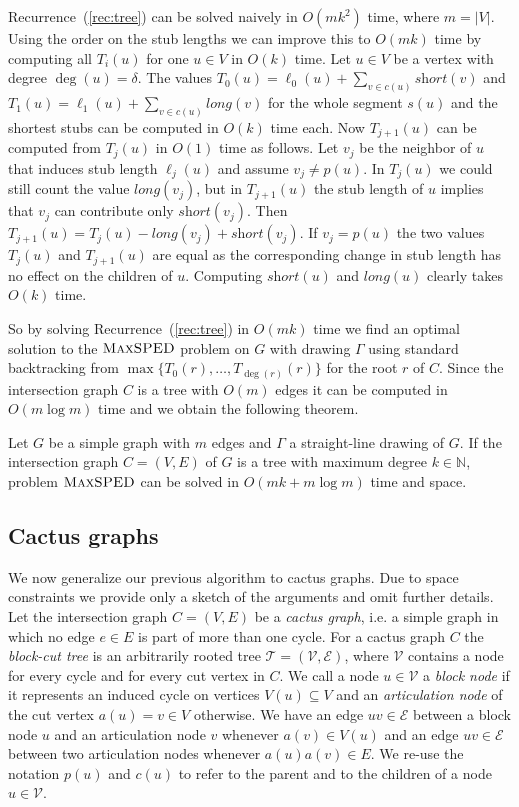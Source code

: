 \documentclass[a4paper, USenglish]{llncs}
\newcommand{\maxsped}{\ensuremath{\textsc{MaxSPED}}\xspace}
\newcommand{\sollong}{\ensuremath{\textit{long}}\xspace}
\newcommand{\solshort}{\ensuremath{\textit{short}}\xspace}
\begin{document}
	Recurrence~(\ref{rec:tree}) can be solved naively in $ O(mk^2) $ time, where $m = |V|$. 
	Using the order on the stub lengths  we can improve this to $ O(mk) $ time by computing all $ T_i(u) $ for one $ u \in V $ in $O(k)$ time.
	Let $u \in V$ be a vertex with degree $\deg(u) = \delta$. 
	The values $T_0(u) = \ell_0(u) + \sum_{v\in c(u)} \solshort(v)$ and $T_1(u) = \ell_1(u) + \sum_{v\in c(u)} \sollong(v)$ for the whole segment $s(u)$ and the shortest stubs can be computed in $O(k)$ time each.
	Now $T_{j+1}(u)$ can be computed from $T_j(u)$ in $O(1)$ time as follows.
	Let $v_j $ be the neighbor of $u$ that induces stub length $\ell_j(u)$ and assume $v_j \ne p(u)$.
	In $T_j(u)$ we could still count the value $\sollong(v_j)$, but in $T_{j+1}(u)$ the stub length of $u$ implies that $v_j$ can contribute only $\solshort(v_j)$. 
	Then $T_{j+1}(u) = T_j(u) - \sollong(v_j) + \solshort(v_j)$.
	If $v_j=p(u)$ the two values $T_j(u)$ and $T_{j+1}(u)$ are equal as the corresponding change in stub length has no effect on the children of $u$.
	Computing $\solshort(u)$ and $\sollong(u)$ clearly takes $O(k)$ time.
	
	So by solving Recurrence~(\ref{rec:tree}) in $O(mk)$ time we find an optimal solution to the \maxsped problem on $ G $ with drawing $ \Gamma $ using standard backtracking from $\max\{T_0(r), \dots, T_{\deg(r)}(r)\}$ for the root $r$ of $C$.	
	Since the intersection graph $C$ is a tree with $O(m)$ edges it can be computed in $O(m \log m)$ time and we obtain the following theorem.
	
	\begin{theorem}
		\label{thm:tree}
		Let $ G $ be a simple graph with $m$ edges and $ \Gamma $ a straight-line drawing of $ G $. If the intersection graph $ C = (V,E) $ of $ G $ is a tree with maximum degree $ k \in \mathbb{N} $, problem \maxsped can be solved in $ O(mk + m \log m) $ time and space.
	\end{theorem}

	\subsection{Cactus graphs}
	\label{sec:cactus}
	
	We now generalize our previous algorithm to cactus graphs. 
	Due to space constraints we provide only a sketch of the arguments and omit further details.
	Let the intersection graph $ C = (V,E) $ be a \emph{cactus graph}, i.e. a simple graph in which no edge $ e \in E $ is part of more than one cycle. 
	For a cactus graph $ C $ the \emph{block-cut tree} is an arbitrarily rooted tree $ \mathcal T = (\mathcal V, \mathcal E) $, where $ \mathcal V $ contains a node for every cycle and for every cut vertex in $ C $. 
	We call a node $ u \in \mathcal V $ a \emph{block node} if it represents an induced cycle on vertices $ V(u) \subseteq V $ and an \emph{articulation node} of the cut vertex $ a(u) = v \in V $ otherwise. 
	We have an edge $ uv \in \mathcal E $ between a block node $ u $ and an articulation node $ v $ whenever $ a(v) \in V(u) $ and an edge $ uv \in \mathcal E $ between two articulation nodes whenever $ a(u)a(v) \in E$. %
	We re-use the notation $p(u)$ and $c(u)$ to refer to the parent and to the children of a node $u \in \mathcal V$.
	
\end{document}
